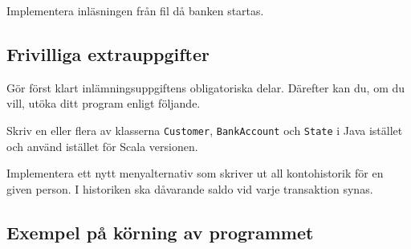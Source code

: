 \Subtask Implementera inläsningen från fil då banken startas.


\subsection{Frivilliga extrauppgifter}

Gör först klart inlämningsuppgiftens obligatoriska delar. Därefter kan du, om du vill, utöka ditt
program enligt följande.

\Task Skriv en eller flera av klasserna \texttt{Customer}, \texttt{BankAccount} och \texttt{State} i Java istället och använd istället för Scala versionen.

\Task	Implementera ett nytt menyalternativ som skriver ut all kontohistorik för en given person. I historiken ska dåvarande saldo vid varje transaktion synas.

\subsection{Exempel på körning av programmet}

